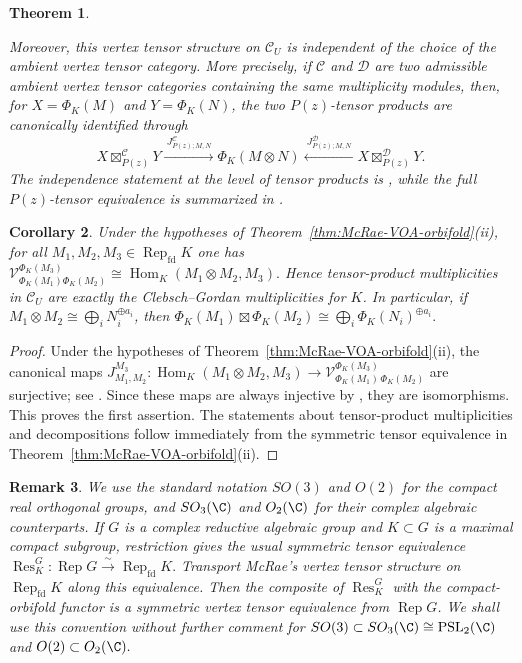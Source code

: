 \documentclass[12pt,leqno]{amsart}
\numberwithin{equation}{section} \newtheorem{thm}{Theorem}[section] \newtheorem{lem}[thm]{Lemma} \newtheorem{ex}[thm]{Example} \newtheorem{prop}[thm]{Proposition} \newtheorem{cor}[thm]{Corollary} \newtheorem{defi}[thm]{Definition} \newtheorem{rmk}[thm]{Remark} \newtheorem{notation}[thm]{Notation}
\newcommand{\Res}{\operatorname{Res}}
\newcommand{\Rep}{\operatorname{Rep}}
\newcommand{\Hom}{\operatorname{Hom}}
\newcommand{\PSLtwo}{\operatorname{PSL}_2(\C)}
\begin{document}
\begin{thm}
\begin{enumerate}[label=\textnormal{(\roman*)}]
Moreover, this vertex tensor structure on $\mathcal C_U$ is independent of the choice of the ambient vertex tensor category. More precisely, if $\mathcal C$ and $\mathcal D$ are two admissible ambient vertex tensor categories containing the same multiplicity modules, then, for $X=\Phi_K(M)$ and $Y=\Phi_K(N)$, the two $P(z)$-tensor products are canonically identified through
\[
 X\boxtimes^{\mathcal C}_{P(z)}Y
 \xrightarrow{\ J^{\mathcal C}_{P(z);M,N}\ }
 \Phi_K(M\otimes N)
 \xleftarrow{\ J^{\mathcal D}_{P(z);M,N}\ }
 X\boxtimes^{\mathcal D}_{P(z)}Y.
\]
The independence statement at the level of tensor products is \cite[Remark~4.9]{McRae}, while the full $P(z)$-tensor equivalence is summarized in \cite[Remark~4.10]{McRae}.
\end{enumerate}
\end{thm}

\begin{cor}\label{cor:McRae-VOA-fusion}
Under the hypotheses of Theorem~\ref{thm:McRae-VOA-orbifold}(ii), for all $M_1,M_2,M_3\in\Rep_{\mathrm{fd}}K$ one has \(\mathcal V^{\Phi_K(M_3)}_{\Phi_K(M_1) \Phi_K(M_2)}\cong\Hom_K(M_1\otimes M_2,M_3).\) Hence tensor-product multiplicities in $\mathcal C_U$ are exactly the Clebsch--Gordan multiplicities for $K$. In particular, if \(M_1\otimes M_2\cong\bigoplus_i N_i^{\oplus a_i}\), then \(\Phi_K(M_1)\boxtimes\Phi_K(M_2)\cong\bigoplus_i\Phi_K(N_i)^{\oplus a_i}.\)
\end{cor}

\begin{proof}
Under the hypotheses of Theorem~\ref{thm:McRae-VOA-orbifold}(ii), the canonical maps \(J^{M_3}_{M_1,M_2}: \Hom_K(M_1\otimes M_2,M_3) \longrightarrow \mathcal V^{\Phi_K(M_3)}_{\Phi_K(M_1)\,\Phi_K(M_2)}\) are surjective; see \cite[\S4]{McRae}. Since these maps are always injective by \cite[\S3.2]{McRae}, they are isomorphisms. This proves the first assertion. The statements about tensor-product multiplicities and decompositions follow immediately from the symmetric tensor equivalence in Theorem~\ref{thm:McRae-VOA-orbifold}(ii).
\end{proof}

\begin{rmk}\label{rmk:compact-complexification}
We use the standard notation $SO(3)$ and $O(2)$ for the compact real orthogonal groups, and $SO_3(\C)$ and $O_2(\C)$ for their complex algebraic counterparts. If $G$ is a complex reductive algebraic group and $K\subset G$ is a maximal compact subgroup, restriction gives the usual symmetric tensor equivalence $ \Res^G_K:\Rep G\overset{\sim}{\longrightarrow}\Rep_{\mathrm{fd}}K. $ Transport McRae's vertex tensor structure on $\Rep_{\mathrm{fd}}K$ along this equivalence. Then the composite of $\Res^G_K$ with the compact-orbifold functor is a symmetric vertex tensor equivalence from $\Rep G$. We shall use this convention without further comment for $ SO(3)\subset SO_3(\C)\cong\PSLtwo $ and $ O(2)\subset O_2(\C). $
\end{rmk}
\end{document}
